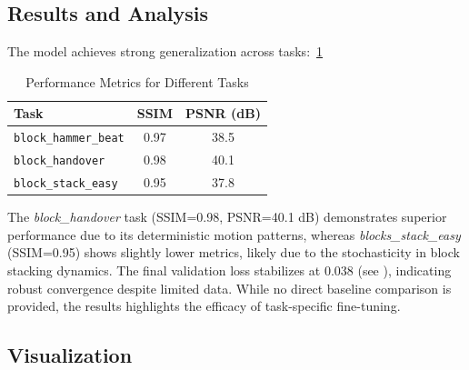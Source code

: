\subsection{Results and Analysis}
\label{sec:exp-results-analysis}

The model achieves strong generalization across tasks:~\ref{tab:performance_metrics}

\begin{table}
    \centering
    \begin{tabular}{@{}lcc@{}}
        \toprule
        \textbf{Task} & \textbf{SSIM} & \textbf{PSNR (dB)} \\
        \midrule
        \texttt{block\_hammer\_beat} & 0.97 & 38.5 \\
        \texttt{block\_handover} & 0.98 & 40.1 \\
        \texttt{block\_stack\_easy} & 0.95 & 37.8 \\
        \bottomrule
    \end{tabular}
    \caption{Performance Metrics for Different Tasks}
    \label{tab:performance_metrics}
\end{table}

The \textit{block\_handover} task (SSIM=0.98, PSNR=40.1 dB) demonstrates superior performance 
    due to its deterministic motion patterns, 
whereas \textit{blocks\_stack\_easy} (SSIM=0.95) shows slightly lower metrics, 
    likely due to the stochasticity in block stacking dynamics.
The final validation loss stabilizes at 0.038 (see ), 
    indicating robust convergence despite limited data.
While no direct baseline comparison is provided, 
    the results highlights the efficacy of task-specific fine-tuning.

\subsection{Visualization}
\label{sec:exp-visualization}

